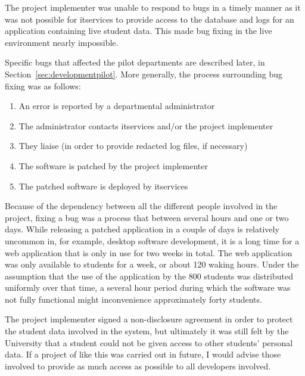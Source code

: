\mynobreakpar

The project implementer was unable to respond to bugs in a timely manner as it
was not possible for \gls{itservices} to provide access to the database and
logs for an application containing live student data. This made bug fixing in
the live environment nearly impossible.

Specific bugs that affected the pilot departments are described later, in
Section~\ref{sec:developmentpilot}. More generally, the process surrounding
bug fixing was as follows:

\begin{enumerate}
  \item An error is reported by a departmental administrator
  \item The administrator contacts \gls{itservices} and/or the project implementer
  \item They liaise (in order to provide redacted log files, if necessary)
  \item The software is patched by the project implementer
  \item The patched software is deployed by \gls{itservices}
\end{enumerate}

Because of the dependency between all the different people involved in the
project, fixing a bug was a process that between several hours and one or two
days. While releasing a patched application in a couple of days is relatively
uncommon in, for example, desktop software development, it is a long time for
a web application that is only in use for two weeks in total. The web
application was only available to students for a week, or about 120 waking
hours. Under the assumption that the use of the application by the 800
students was distributed uniformly over that time, a several hour period
during which the software was not fully functional might inconvenience
approximately forty students.

The project implementer signed a non-disclosure agreement in order to protect
the student data involved in the system, but ultimately it was still felt by
the University that a student could not be given access to other students'
personal data. If a project of like this was carried out in future, I would
advise those involved to provide as much access as possible to all developers
involved.

\mynobreakpar

